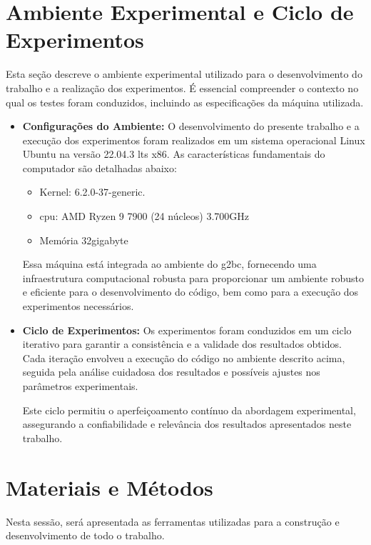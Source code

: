 \section{Ambiente Experimental e Ciclo de Experimentos}
Esta seção descreve o ambiente experimental utilizado para o desenvolvimento do trabalho e a realização dos experimentos. É essencial compreender o contexto no qual os testes foram conduzidos, incluindo as especificações da máquina utilizada.

\begin{itemize}

  \item \textbf{Configurações do Ambiente:}
        O desenvolvimento do presente trabalho e a execução dos experimentos foram realizados em um sistema operacional Linux Ubuntu na versão 22.04.3 \gls{lts} x86. As características fundamentais do computador são detalhadas abaixo:
        \begin{itemize}
          \item Kernel: 6.2.0{-}37-generic.
          \item \gls{cpu}: AMD Ryzen 9 7900 (24 núcleos) 3.700GHz
          \item Memória 32\gls{gigabyte}
        \end{itemize}

        Essa máquina está integrada ao ambiente do \gls{g2bc}, fornecendo uma infraestrutura computacional robusta para proporcionar um ambiente robusto e eficiente para o desenvolvimento do código, bem como para a execução dos experimentos necessários.

  \item \textbf{Ciclo de Experimentos:}
        Os experimentos foram conduzidos em um ciclo iterativo para garantir a consistência e a validade dos resultados obtidos. Cada iteração envolveu a execução do código no ambiente descrito acima, seguida pela análise cuidadosa dos resultados e possíveis ajustes nos parâmetros experimentais.

        Este ciclo permitiu o aperfeiçoamento contínuo da abordagem experimental, assegurando a confiabilidade e relevância dos resultados apresentados neste trabalho.

\end{itemize}
\section{Materiais e Métodos}
Nesta sessão, será apresentada as ferramentas utilizadas para a construção e desenvolvimento de todo o trabalho.

